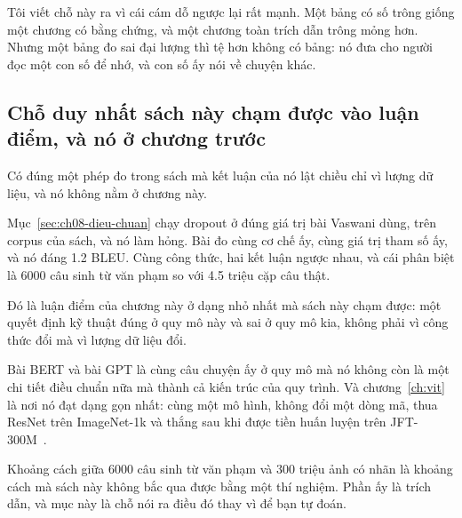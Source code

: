 Tôi viết chỗ này ra vì cái cám dỗ ngược lại rất mạnh. Một bảng có số trông
giống một chương có bằng chứng, và một chương toàn trích dẫn trông mỏng hơn.
Nhưng một bảng đo sai đại lượng thì tệ hơn không có bảng: nó đưa cho người đọc
một con số để nhớ, và con số ấy nói về chuyện khác.

\subsection*{Chỗ duy nhất sách này chạm được vào luận điểm, và nó ở chương trước}

%
Có đúng một phép đo trong sách mà kết luận của nó lật chiều chỉ vì lượng dữ
liệu, và nó không nằm ở chương này.

Mục~\ref{sec:ch08-dieu-chuan} chạy dropout ở đúng giá trị bài Vaswani dùng, trên
corpus của sách, và nó làm hỏng. Bài đo cùng cơ chế ấy, cùng giá trị tham số
ấy, và nó đáng 1.2 BLEU. Cùng công thức, hai kết luận ngược nhau, và cái phân
biệt là 6000 câu sinh từ văn phạm so với 4.5 triệu cặp câu thật.

Đó là luận điểm của chương này ở dạng nhỏ nhất mà sách này chạm được: một quyết
định kỹ thuật đúng ở quy mô này và sai ở quy mô kia, không phải vì công thức
đổi mà vì lượng dữ liệu đổi.

Bài BERT và bài GPT là cùng câu chuyện ấy ở quy mô mà nó không còn là một chi
tiết điều chuẩn nữa mà thành cả kiến trúc của quy trình. Và
chương~\ref{ch:vit} là nơi nó đạt dạng gọn nhất: cùng một mô hình, không đổi
một dòng mã, thua ResNet trên ImageNet-1k và thắng sau khi được tiền huấn luyện
trên JFT-300M~\autocite{dosovitskiy2021vit}.

Khoảng cách giữa 6000 câu sinh từ văn phạm và 300 triệu ảnh có nhãn là khoảng
cách mà sách này không bắc qua được bằng một thí nghiệm. Phần ấy là trích dẫn,
và mục này là chỗ nói ra điều đó thay vì để bạn tự đoán.
